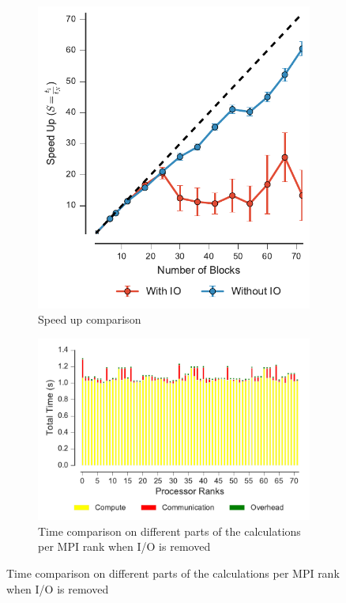 
 \begin{figure}[ht!]
\centering
\begin{subfigure}{.35\textwidth}
  \includegraphics[width=\linewidth]{figures/speed_up-effect-of-IO.pdf}
  \caption{Speed up comparison}
  \label{fig:MPIspeedup-no-IO}
\end{subfigure}
\hfill
\begin{subfigure}{.6\textwidth}
  \includegraphics[width=\linewidth]{figures/BarPlot-rank-comparison-no-IO.pdf}
  \caption{Time comparison on different parts of the calculations per MPI rank when I/O is removed}
  \label{fig:MPIranks-no-IO}
\end{subfigure}


\end{figure}
